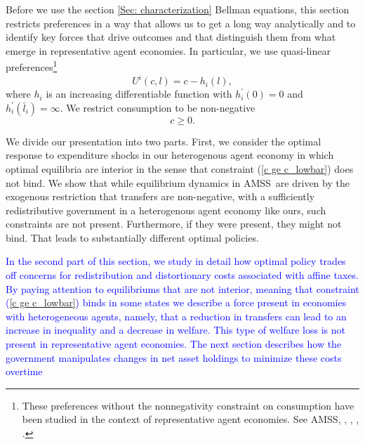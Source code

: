 \documentclass[thmsb,11pt]{article}
\begin{document}
\smallskip
Before we use the section \ref{Sec: characterization}  Bellman equations, this section restricts preferences in a way that allows us to get a long way analytically and to identify
key forces that drive outcomes and that  distinguish them from what emerge in  representative agent economies.
In particular, we use  quasi-linear preferences\footnote{These preferences without the nonnegativity constraint on consumption have been studied in
the context of representative
agent economies.
See  AMSS, \cite{Farhi2010}, \cite{Battaglini2007,Battaglini2008}, \cite{Yared2012}, \cite{Faraglia2011}.}
\begin{equation}
U^{i}\left( c,l\right) =c-h_{i}(l),  \label{quasilinear}
\end{equation}%
where $h_{i}$ is an increasing differentiable function with $h_{i}^{\prime
}\left( 0\right) =0$ and $h_{i}^{\prime }\left( \bar{l}_{i}\right) =\infty $.
We restrict consumption  to be non-negative
\begin{equation}
c\geq 0.  \label{c ge c_lowbar}
\end{equation}%

We divide our presentation   into two parts. First, we
consider the optimal response to expenditure shocks in our heterogenous agent
economy in which optimal equilibria are interior in the sense that  constraint (\ref{c ge c_lowbar}) does not bind. %
We show that while  equilibrium dynamics in AMSS\ are
driven by the exogenous restriction that transfers are non-negative,  with a sufficiently redistributive government in
a heterogenous agent economy  like ours, such
constraints are not present. Furthermore, if they were present, they might not bind.  That leads to substantially different  optimal policies.


\textcolor{blue}{In the second part of this section, we study in detail how optimal policy trades off concerns for redistribution and distortionary costs associated with affine taxes. By paying attention to equilibriums that are not interior, meaning that constraint (\ref{c ge c_lowbar}) binds in
some states we describe a force
present in economies with heterogeneous %
agents, namely, that a
reduction in transfers can lead to an increase in inequality and a
decrease in welfare. This type of welfare loss is not present in
representative agent economies. The next section describes how the government manipulates changes in net asset holdings to minimize these costs overtime}
\end{document}
